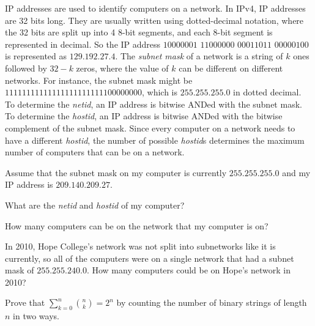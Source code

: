 \begin{pro}
IP addresses are used to identify computers on a network.  In IPv4, IP addresses are 32 bits long.
They are usually written using dotted-decimal notation, where the 32 bits are split up into 4 8-bit segments,
and each 8-bit segment is represented in decimal.  So the IP address $10000001$ $11000000$ $00011011$ $00000100$
is represented as $129.192.27.4$.
The {\em subnet mask} of a network is a string of $k$ ones followed by $32-k$ zeros, where the value of $k$
can be different on different networks.  For instance, the subnet mask might be 
$11111111111111111111111100000000$, which is $255.255.255.0$ in dotted decimal.
To determine the {\em netid}, an IP address is bitwise ANDed with the subnet mask.  
To determine the {\em hostid}, an IP address is bitwise ANDed with the bitwise complement of the subnet mask.
Since every computer on a network needs to have a different {\em hostid}, the number of possible 
{\em hostid}s determines the maximum number of computers that can be on a network.

Assume that the subnet mask on my computer is currently $255.255.255.0$ and my IP address is $209.140.209.27$.
\begin{lenum}
\item
What are the {\em netid} and {\em hostid} of my computer?
\item
How many computers can be on the network that my computer is on?
\item
In 2010, Hope College's network was not split into subnetworks like it is currently, so all of the
computers were on a single network that had a subnet mask of $255.255.240.0$.  
How many computers could be on Hope's network in 2010?
\end{lenum}
\end{pro}
\begin{pro}
Prove that ${\displaystyle \sum_{k=0}^{n} \binom{n}{k}=2^n}$ by counting the number of binary strings
of length $n$ in two ways.
\end{pro}

